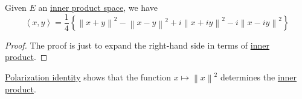 \begin{lemma}\label{lma:polatization-identity}
	Given \(E\) an \hyperref[def:inner-product-space]{inner product space}, we have
	\[
		\left\langle x, y \right\rangle = \frac{1}{4}\left\{ \left\lVert x+y\right\rVert ^{2} - \left\lVert x-y\right\rVert ^{2} + i \left\lVert x+iy\right\rVert ^{2} - i\left\lVert x-iy\right\rVert ^{2}  \right\}
	\]
\end{lemma}
\begin{proof}
	The proof is just to expand the right-hand side in terms of \hyperref[def:inner-product]{inner product}.
\end{proof}

\begin{remark}
	\hyperref[lma:polatization-identity]{Polarization identity} shows that the function \(x\mapsto \left\lVert x\right\rVert ^{2} \) determines the \hyperref[def:inner-product]{inner product}.
\end{remark}